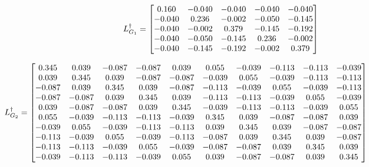 \documentclass{article}
\begin{document}
	\hspace{2pt}
	
	\[
	L^{\dag}_{G_1}=
	\begin{bmatrix}
		0.160 & -0.040 & -0.040 & -0.040 & -0.040 \cr
		-0.040 &  0.236 & -0.002 & -0.050 & -0.145 \cr
		-0.040 & -0.002 &  0.379 & -0.145 & -0.192 \cr
		-0.040 & -0.050 & -0.145 &  0.236 & -0.002 \cr
		-0.040 & -0.145 & -0.192 & -0.002 &  0.379
	\end{bmatrix}
	\]
	
	\setlength{\leftskip}{-3cm}
	\begin{equation*}
		\hspace*{-3cm}
		L^{\dag}_{G_2}=
		\begin{bmatrix}
			0.345 &  0.039 & -0.087 & -0.087 &  0.039 &  0.055 & -0.039 & -0.113 & -0.113 & -0.039 \cr
			0.039 &  0.345 &  0.039 & -0.087 & -0.087 & -0.039 &  0.055 & -0.039 & -0.113 & -0.113 \cr
			-0.087 &  0.039 &  0.345 &  0.039 & -0.087 & -0.113 & -0.039 &  0.055 & -0.039 & -0.113 \cr
			-0.087 & -0.087 &  0.039 &  0.345 &  0.039 & -0.113 & -0.113 & -0.039 &  0.055 & -0.039 \cr
			0.039 & -0.087 & -0.087 &  0.039 &  0.345 & -0.039 & -0.113 & -0.113 & -0.039 &  0.055 \cr
			0.055 & -0.039 & -0.113 & -0.113 & -0.039 &  0.345 &  0.039 & -0.087 & -0.087 &  0.039 \cr
			-0.039 &  0.055 & -0.039 & -0.113 & -0.113 &  0.039 &  0.345 &  0.039 & -0.087 & -0.087 \cr
			-0.113 & -0.039 &  0.055 & -0.039 & -0.113 & -0.087 &  0.039 &  0.345 &  0.039 & -0.087 \cr
			-0.113 & -0.113 & -0.039 &  0.055 & -0.039 & -0.087 & -0.087 &  0.039 &  0.345 &  0.039 \cr
			-0.039 & -0.113 & -0.113 & -0.039 &  0.055 &  0.039 & -0.087 & -0.087 &  0.039 &  0.345
		\end{bmatrix}
	\end{equation*}
	\setlength{\leftskip}{0pt}
	
\end{document}
